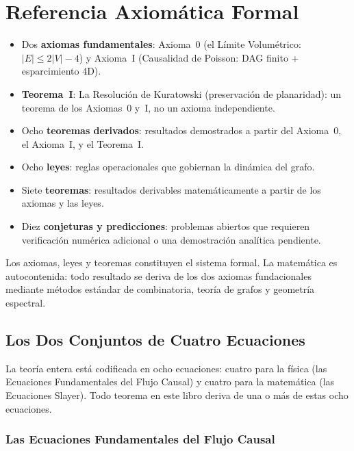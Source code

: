 \documentclass[11pt, a4paper, openany]{book}
\newenvironment{introduction}[1][Sinopsis del M\'odulo]{%
  \begin{tcolorbox}[
    enhanced,colback=structure!5,colframe=structure,
    colbacktitle=structure,coltitle=white,
    fonttitle=\small\bfseries,title={#1},
    arc=2pt,boxrule=0.7pt,
    left=8pt,right=8pt,top=6pt,bottom=6pt,
    before skip=12pt,after skip=12pt
  ]\itshape\begin{itemize}[leftmargin=*,itemsep=2pt,parsep=0pt]
}{%
  \end{itemize}\end{tcolorbox}
}
\begin{document}
\chapter{Referencia Axiom\'atica Formal}
\label{app:axioms}

\begin{introduction}[Estructura del Sistema Formal]
  \item Dos \textbf{axiomas fundamentales}: Axioma~0 (el L\'imite
        Volum\'etrico: $|E| \leq 2|V| - 4$) y Axioma~I (Causalidad de
        Poisson: DAG finito + esparcimiento 4D).
  \item \textbf{Teorema~I}: La Resoluci\'on de Kuratowski (preservaci\'on
        de planaridad): un teorema de los Axiomas~0 y~I, no un axioma
        independiente.
  \item Ocho \textbf{teoremas derivados}: resultados demostrados a partir
        del Axioma~0, el Axioma~I, y el Teorema~I.
  \item Ocho \textbf{leyes}: reglas operacionales que gobiernan la din\'amica
        del grafo.
  \item Siete \textbf{teoremas}: resultados derivables matem\'aticamente a
        partir de los axiomas y las leyes.
  \item Diez \textbf{conjeturas y predicciones}: problemas abiertos que
        requieren verificaci\'on num\'erica adicional o una demostraci\'on
        anal\'itica pendiente.
\end{introduction}

\noindent
Los axiomas, leyes y teoremas constituyen el sistema formal. La
matem\'atica es autocontenida: todo resultado se deriva de los dos
axiomas fundacionales mediante m\'etodos est\'andar de combinatoria,
teor\'ia de grafos y geometr\'ia espectral.

\section{Los Dos Conjuntos de Cuatro Ecuaciones}
\label{sec:two-sets}

La teor\'ia entera est\'a codificada en ocho ecuaciones: cuatro para la
f\'isica (las Ecuaciones Fundamentales del Flujo Causal) y cuatro para
la matem\'atica (las Ecuaciones Slayer). Todo teorema en este libro
deriva de una o m\'as de estas ocho ecuaciones.

\subsection{Las Ecuaciones Fundamentales del Flujo Causal}
\end{document}
